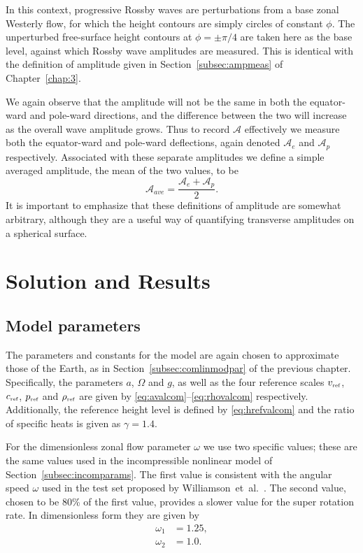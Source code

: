 In this context, progressive Rossby waves are perturbations from a base zonal Westerly flow, for which the height contours are simply circles of constant $\phi$. The unperturbed free-surface height contours at $\phi=\pm\pi/4$ are taken here as the base level, against which Rossby wave amplitudes are measured. This is identical with the definition of amplitude given in Section~\ref{subsec:ampmeas} of Chapter~\ref{chap:3}.

We again observe that the amplitude will not be the same in both the equator-ward and pole-ward directions, and the difference between the two will increase as the overall wave amplitude grows. Thus to record $\mathcal{A}$ effectively we measure both the equator-ward and pole-ward deflections, again denoted $\mathcal{A}_{e}$ and $\mathcal{A}_{p}$ respectively. Associated with these separate amplitudes we define a simple averaged amplitude, the mean of the two values, to be
\begin{equation}
\mathcal{A}_{ave}=\frac{\mathcal{A}_{e}+\mathcal{A}_{p}}{2}.
\end{equation}
It is important to emphasize that these definitions of amplitude are somewhat arbitrary, although they are a useful way of quantifying transverse amplitudes on a spherical surface.

\section{Solution and Results}

\subsection{Model parameters}
The parameters and constants for the model are again chosen to approximate those of the Earth, as in Section~\ref{subsec:comlinmodpar} of the previous chapter. Specifically, the parameters $a$, $\Omega$ and $g$, as well as the four reference scales $v_{\mbox{\tiny ref}}$, $c_{\mbox{\tiny ref}}$, $p_{\mbox{\tiny ref}}$ and $\rho_{\mbox{\tiny ref}}$ are given by \eqref{eq:avalcom}--\eqref{eq:rhovalcom} respectively. Additionally, the reference height level is defined by \eqref{eq:hrefvalcom} and the ratio of specific heats is given as $\gamma=1.4$. 

For the dimensionless zonal flow parameter $\omega$ we use two specific values; these are the same values used in the incompressible nonlinear model of Section~\ref{subsec:incomparams}. The first value is consistent with the angular speed $\omega$ used in the test set proposed by Williamson~et~al.~\cite{Williamson:STS}. The second value, chosen to be 80\% of the first value, provides a slower value for the super rotation rate. In dimensionless form they are given by
\begin{align}
\omega_1 & = 1.25, \\
\omega_2 & = 1.0.
\end{align}

